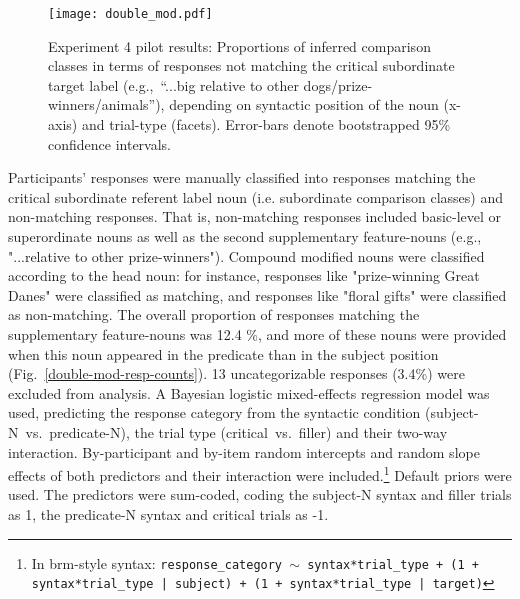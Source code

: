 \begin{figure*}[h]
	\begin{center}
		\texttt{[image: double\_mod.pdf]}
	\end{center}
	\vspace{-0.3cm}
	\caption{Experiment 4 pilot results: Proportions of inferred comparison classes in terms of responses not matching the critical subordinate target label (e.g.,~“...big relative to other dogs/prize-winners/animals”), depending on syntactic position of the noun (x-axis) and trial-type (facets). Error-bars denote bootstrapped 95\% confidence intervals.}
	\label{double-mod-results}
\end{figure*}


Participants' responses were manually classified into responses matching the critical subordinate referent label noun (i.e. subordinate comparison classes) and non-matching responses. That is, non-matching responses included basic-level or superordinate nouns as well as the second supplementary feature-nouns (e.g., "...relative to other prize-winners"). Compound modified nouns were classified according to the head noun: for instance, responses like "prize-winning Great Danes" were classified as matching, and responses like "floral gifts" were classified as non-matching. The overall proportion of responses matching the supplementary feature-nouns was 12.4 \%, and more of these nouns were provided when this noun appeared in the predicate than in the subject position (Fig.~\ref{double-mod-resp-counts}). 
13 uncategorizable responses (3.4\%) were excluded from analysis. 
A Bayesian logistic mixed-effects regression model was used, predicting the response category from the syntactic condition (subject-N~vs.~predicate-N), the trial type (critical~vs.~filler) and their two-way interaction. By-participant and by-item random intercepts and random slope effects of both predictors and their interaction were included.\footnote{In brm-style syntax: \texttt{response\_category $\sim$ syntax*trial\_type + (1 + syntax*trial\_type | subject) + (1 + syntax*trial\_type | target)}}  
Default priors were used. The predictors were sum-coded, coding the subject-N syntax and filler trials as 1, the predicate-N syntax and critical trials as -1.%

